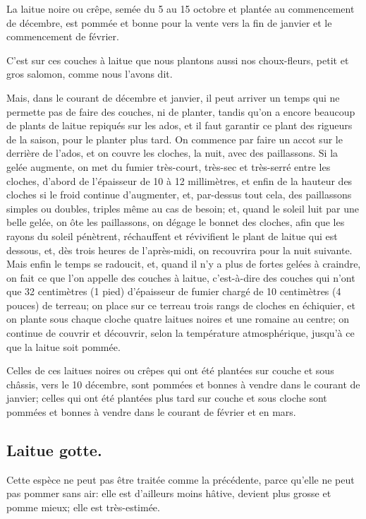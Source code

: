 \documentclass[10pt,a4paper]{book}
\begin{document}
La laitue noire ou crêpe, semée du 5 au 15 octobre et plantée au commencement de décembre, est pommée et bonne pour la vente vers la fin de janvier et le commencement de février.

C'est sur ces couches à laitue que nous plantons aussi nos choux-fleurs, petit et gros salomon, comme nous l'avons dit.

Mais, dans le courant de décembre et janvier, il peut arriver un temps qui ne permette pas de faire des couches, ni de planter, tandis qu'on a encore beaucoup de plants de laitue repiqués sur les ados, et il faut garantir ce plant des rigueurs de la saison, pour le planter plus tard. On commence par faire un accot sur le derrière de l'ados, et on couvre les cloches, la nuit, avec des paillassons. Si la gelée augmente, on met du fumier très-court, très-sec et très-serré entre les cloches, d'abord de l'épaisseur de 10 à 12 millimètres, et enfin de la hauteur des cloches si le froid continue d'augmenter, et, par-dessus tout cela, des paillassons simples ou doubles, triples même au cas de besoin; et, quand le soleil luit par une belle gelée, on ôte les paillassons, on dégage le bonnet des cloches, afin que les rayons du soleil pénètrent, réchauffent et révivifient le plant de laitue qui est dessous, et, dès trois heures de l'après-midi, on recouvrira pour la nuit suivante. Mais enfin le temps se radoucit, et, quand il n'y a plus de fortes gelées à craindre, on fait ce que l'on appelle des couches à laitue, c'est-à-dire des couches qui n'ont que 32 centimètres (1 pied) d'épaisseur de fumier chargé de 10 centimètres (4 pouces) de terreau; on place sur ce terreau trois rangs de cloches en échiquier, et on plante sous chaque cloche quatre laitues noires et une romaine au centre; on continue de couvrir et découvrir, selon la température atmosphérique, jusqu'à ce que la laitue soit pommée.

Celles de ces laitues noires ou crêpes qui ont été plantées sur couche et sous châssis, vers le 10 décembre, sont pommées et bonnes à vendre dans le courant de janvier; celles qui ont été plantées plus tard sur couche et sous cloche sont pommées et bonnes à vendre dans le courant de février et en mars.

\subsection{Laitue gotte.}

Cette espèce ne peut pas être traitée comme la précédente, parce qu'elle ne peut pas pommer sans air: elle est d'ailleurs moins hâtive, devient plus grosse et pomme mieux; elle est très-estimée.
\end{document}
